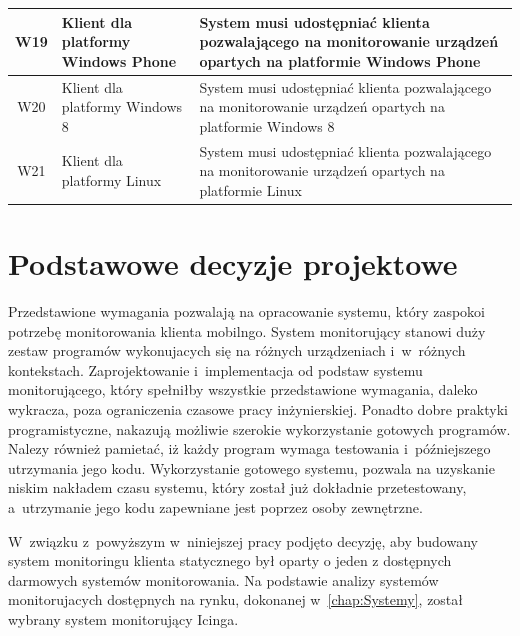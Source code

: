 \begin{longtable}[c]{|c||p{3.5cm}|p{9cm}|}
  W19 & \raggedright{Klient dla platformy Windows Phone} & \raggedright{System musi udostępniać klienta pozwalającego na monitorowanie urządzeń opartych na platformie Windows Phone} \tabularnewline 
  \hline

  W20 & \raggedright{Klient dla platformy Windows 8} & \raggedright{System musi udostępniać klienta pozwalającego na monitorowanie urządzeń opartych na platformie Windows 8} \tabularnewline
  \hline

  W21 & \raggedright{Klient dla platformy Linux} & \raggedright{System musi udostępniać klienta pozwalającego na monitorowanie urządzeń opartych na platformie Linux} \tabularnewline
  \hline
\end{longtable}

\section[Decyzje projektowe][Podstawowe decyzje projektowe]{Podstawowe decyzje projektowe}

Przedstawione wymagania pozwalają na opracowanie systemu, który
zaspokoi potrzebę monitorowania klienta mobilngo. System monitorujący
stanowi duży zestaw programów wykonujacych się na różnych urządzeniach
i~w~różnych kontekstach. Zaprojektowanie i~implementacja od podstaw
systemu monitorującego, który spełniłby wszystkie przedstawione
wymagania, daleko wykracza, poza ograniczenia czasowe pracy
inżynierskiej. Ponadto dobre praktyki programistyczne, nakazują
możliwie szerokie wykorzystanie gotowych programów. Nalezy również
pamietać, iż każdy program wymaga testowania i~późniejszego utrzymania
jego kodu. Wykorzystanie gotowego systemu, pozwala na uzyskanie niskim
nakładem czasu systemu, który został już dokładnie przetestowany,
a~utrzymanie jego kodu zapewniane jest poprzez osoby zewnętrzne.

W~związku z~powyższym w~niniejszej pracy podjęto decyzję, aby budowany
system monitoringu klienta statycznego był oparty o jeden z dostępnych
darmowych systemów monitorowania. Na podstawie analizy systemów
monitorujacych dostępnych na rynku, dokonanej w~\ref{chap:Systemy},
został wybrany system monitorujący Icinga.

